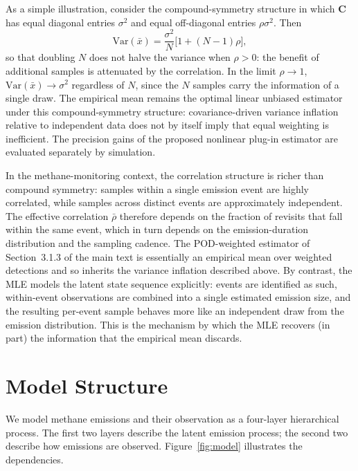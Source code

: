 \documentclass[11pt]{article}
\newcommand{\new}[1]{#1}
\newcommand{\Var}{\mathrm{Var}}
\begin{document}
\new{As a simple illustration, consider the compound-symmetry structure in which $\mathbf{C}$ has equal diagonal entries $\sigma^2$ and equal off-diagonal entries $\rho \sigma^2$. Then
\begin{equation}
    \Var(\bar x) = \frac{\sigma^2}{N}\bigl[1 + (N-1)\rho\bigr],
\end{equation}
so that doubling $N$ does not halve the variance when $\rho > 0$: the benefit of additional samples is attenuated by the correlation. In the limit $\rho \to 1$, $\Var(\bar x) \to \sigma^2$ regardless of $N$, since the $N$ samples carry the information of a single draw. The empirical mean remains the optimal linear unbiased estimator under this compound-symmetry structure: covariance-driven variance inflation relative to independent data does not by itself imply that equal weighting is inefficient. The precision gains of the proposed nonlinear plug-in estimator are evaluated separately by simulation.}

\new{In the methane-monitoring context, the correlation structure is richer than compound symmetry: samples within a single emission event are highly correlated, while samples across distinct events are approximately independent. The effective correlation $\bar\rho$ therefore depends on the fraction of revisits that fall within the same event, which in turn depends on the emission-duration distribution and the sampling cadence. The POD-weighted estimator of Section~3.1.3 of the main text is essentially an empirical mean over weighted detections and so inherits the variance inflation described above. By contrast, the MLE models the latent state sequence explicitly: events are identified as such, within-event observations are combined into a single estimated emission size, and the resulting per-event sample behaves more like an independent draw from the emission distribution. This is the mechanism by which the MLE recovers (in part) the information that the empirical mean discards.}

\section{Model Structure}
\label{sec:model}

We model methane emissions and their observation as a four-layer hierarchical process. The first two layers describe the latent emission process; the second two describe how emissions are observed. Figure~\ref{fig:model} illustrates the dependencies.
\end{document}
